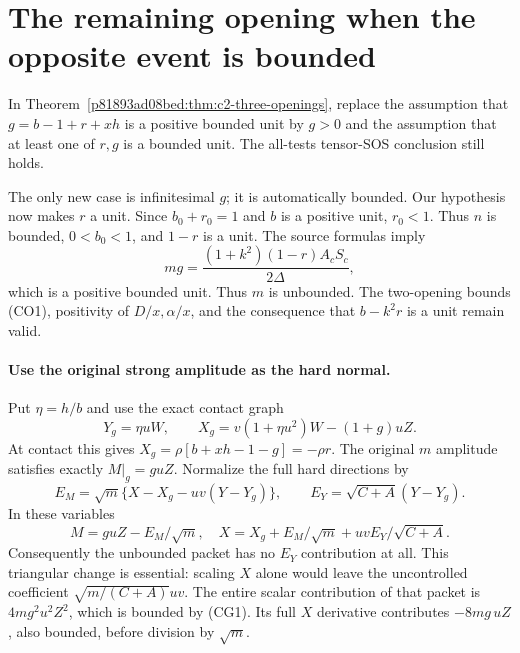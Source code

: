 \section{\texorpdfstring{The remaining opening when the opposite event is bounded}{The remaining opening when the opposite event is bounded}}
\label{component:pd7bd7f0d7fb6}

\label{pd7bd7f0d7fb6:sec:c2-last-opening}

\begin{theorem}
\label{pd7bd7f0d7fb6:thm:c2-no-opening-bounds}
In Theorem~\ref{p81893ad08bed:thm:c2-three-openings}, replace the assumption that
$g=b-1+r+xh$ is a positive bounded unit by $g>0$ and the assumption that at least one of $r,g$ is a bounded
unit.  The all-tests tensor-SOS conclusion still holds.
\end{theorem}

The only new case is infinitesimal $g$; it is automatically bounded.
Our hypothesis now makes $r$ a unit.  Since $b_0+r_0=1$ and $b$ is
a positive unit, $r_0<1$.  Thus $n$ is bounded,
$0<b_0<1$, and $1-r$ is a unit.  The source formulas imply
\[
               mg=\frac{(1+k^2)(1-r)A_cS_c}{2\Delta},   \tag{CG1}
\]
which is a positive bounded unit.  Thus $m$ is unbounded.  The
two-opening bounds (CO1), positivity of $D/x,\alpha/x$, and the
consequence that $b-k^2r$ is a unit remain valid.

\paragraph{Use the original strong amplitude as the hard normal.}
Put $\eta=h/b$ and use the exact contact graph
\[
 Y_g=\eta uW,\qquad
 X_g=v(1+\eta u^2)W-(1+g)uZ.                            \tag{CG2}
\]
At contact this gives $X_g=\rho[b+xh-1-g]=-\rho r$.
The original $m$ amplitude satisfies exactly $M|_g=guZ$.
Normalize the full hard directions by
\[
 E_M=\sqrt m\{X-X_g-uv(Y-Y_g)\},\qquad
 E_Y=\sqrt{C+A}(Y-Y_g).                                 \tag{CG3}
\]
In these variables
\[
 M=guZ-E_M/\sqrt m,
 \quad
 X=X_g+E_M/\sqrt m+uvE_Y/\sqrt{C+A}.
\]
Consequently the unbounded packet has no $E_Y$ contribution at all.
This triangular change is essential: scaling $X$ alone would leave
the uncontrolled coefficient $\sqrt{m/(C+A)}uv$.
The entire scalar contribution of that packet is $4mg^2u^2Z^2$,
which is bounded by (CG1).  Its full $X$ derivative contributes
$-8mg\,uZ$, also bounded, before division by $\sqrt m$.

